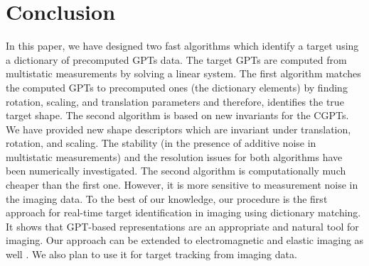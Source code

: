 \section{Conclusion}\label{sec:conclusion}
In this paper, we have designed two fast algorithms which identify
a target using a dictionary of precomputed GPTs data. The target
GPTs are computed from multistatic measurements by solving a
linear system. The first algorithm matches the computed GPTs to
precomputed ones (the dictionary elements) by finding rotation,
scaling, and translation parameters and therefore, identifies the
true target shape. The second algorithm  is based on new
invariants for the CGPTs. We have provided new shape descriptors
which are invariant under translation, rotation, and scaling. The
stability (in the presence of additive noise in multistatic
measurements) and the resolution issues for both algorithms have
been numerically investigated. The second algorithm is
computationally much cheaper than the first one. However, it is
more sensitive to measurement noise in the imaging data. To the
best of our knowledge, our procedure is the first approach for
real-time target identification in imaging using dictionary
matching. It shows that GPT-based representations are an
appropriate and natural tool for imaging. Our approach can be
extended to electromagnetic and elastic imaging as well
\cite{mc2,resol}. We also plan to use it for target tracking from
imaging data.


